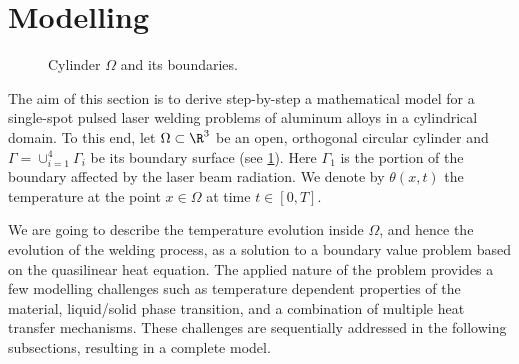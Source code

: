 \section{Modelling}
\label{sec:modelling}

\begin{figure}[ht]
	\centering
	
	\caption{Cylinder $\Omega$ and its boundaries.}
	\label{fig:cylinder}
\end{figure}

The aim of this section is to derive step-by-step a mathematical model for a single-spot pulsed laser welding problems of aluminum alloys in a cylindrical domain.
To this end, let $\Omega	\subset \R^3$ be an open, orthogonal circular cylinder and $\Gamma = \cup_{i=1}^4 \Gamma_i$ be its boundary surface (see \cref{fig:cylinder}).
Here $\Gamma_1$ is the portion of the boundary affected by the laser beam radiation.
We denote by $\theta(x,t)$ the temperature at the point $x \in \Omega$ at time $t \in [0,T]$.

We are going to describe the temperature evolution inside $\Omega$, and hence the evolution of the welding process, as a solution to a boundary value problem based on the quasilinear heat equation.
The applied nature of the problem provides a few modelling challenges such as temperature dependent properties of the material, liquid/solid phase transition, and a combination of multiple heat transfer mechanisms.
These challenges are sequentially addressed in the following subsections, resulting in a complete model.




